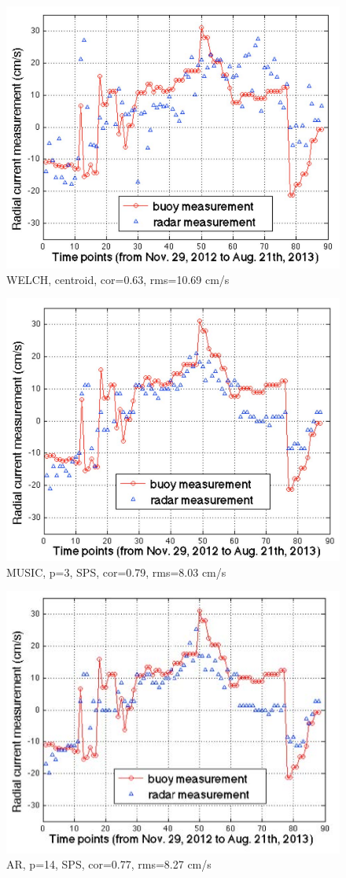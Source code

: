 \documentclass[12pt]{beamer}
\begin{document}
\begin{frame}
  \begin{figure}[htbp]
      \includegraphics[width=0.5\linewidth]{figs/c.jpg}
       \caption{WELCH, centroid, cor=0.63,
       rms=10.69 cm/s}
  \end{figure}
\end{frame}

\begin{frame}
  \begin{figure}[htbp]
      \includegraphics[width=0.5\linewidth]{figs/d.jpg}
       \caption{MUSIC, p=3, SPS, cor=0.79, rms=8.03
       cm/s}
  \end{figure}
\end{frame}

\begin{frame}
  \begin{figure}[htbp]
      \includegraphics[width=0.5\linewidth]{figs/e.jpg}
       \caption{AR, p=14, SPS, cor=0.77, rms=8.27
       cm/s}
  \end{figure}
\end{frame}
\end{document}
